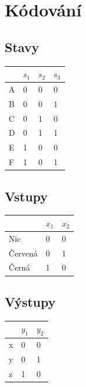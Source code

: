 \documentclass[titlepage]{article}
\begin{document}
\section{Kódování}
\subsection{Stavy}
\begin{center}
\begin{tabular}{|l|l|l|l|}
\hline
& {\bf $s_1$} & {\bf $s_2$} & {\bf $s_3$}\\
\hline
A & 0 & 0 & 0 \\
B & 0 & 0 & 1 \\
C & 0 & 1 & 0 \\
D & 0 & 1 & 1 \\
E & 1 & 0 & 0 \\
F & 1 & 0 & 1 \\
\hline
\end{tabular}
\end{center}

\subsection{Vstupy}
\begin{center}
\begin{tabular}{|l|l|l|}
\hline
& {\bf $x_1$} & {\bf $x_2$} \\
\hline
Nic & 0 & 0 \\
Červená & 0 & 1 \\
Černá & 1 & 0 \\
\hline
\end{tabular}
\end{center}

\subsection{Výstupy}
\begin{center}
\begin{tabular}{|l|l|l|}
\hline
& {\bf $y_1$} & {\bf $y_2$} \\
\hline
x & 0 & 0 \\
y & 0 & 1 \\
z & 1 & 0 \\
\hline
\end{tabular}
\end{center}
\end{document}

